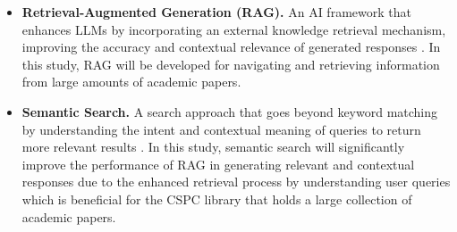 \begin{refsection}
\begin{itemize}
    \item \textbf{Retrieval-Augmented Generation (RAG).} An AI framework that enhances LLMs by incorporating an external knowledge retrieval mechanism, improving the accuracy and contextual relevance of generated responses \cite{lewis2020retrieval}. In this study, RAG will be developed for navigating and retrieving information from large amounts of academic papers.
    \item \textbf{Semantic Search.} A search approach that goes beyond keyword matching by understanding the intent and contextual meaning of queries to return more relevant results \cite{mahboub2024evaluation}. In this study, semantic search will significantly improve the performance of RAG in generating relevant and contextual responses due to the enhanced retrieval process by understanding user queries which is beneficial for the CSPC library that holds a large collection of academic papers.
\end{itemize}

\clearpage

\printbibliography[heading=subbibintoc, title={\centering Notes}]
\end{refsection}